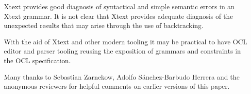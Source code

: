 \documentclass{eceasst}
\begin{document}
Xtext provides good diagnosis of syntactical and simple semantic errors in an Xtext grammar. It is not clear that Xtext provides adequate diagnosis of the unexpected results that may arise through the use of backtracking.

With the aid of Xtext and other modern tooling it may be practical to have OCL editor and parser tooling reusing the exposition of grammars and constraints in the OCL specification.



\begin{acknowledge}
Many thanks to Sebastian Zarnekow, Adolfo S\'anchez-Barbudo Herrera and the anonymous reviewers for helpful comments on earlier versions of this paper.
\end{acknowledge}

\nocite{*}


\end{document}
